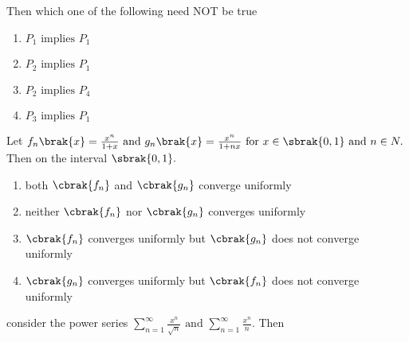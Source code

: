 Then which one of the following need NOT be true
\begin{multicols}{4}
    \begin{enumerate}
        \item $P_{1} \text{ implies } P_{1}$
        \item $P_{2} \text{ implies } P_{1}$
        \item $P_{2} \text{ implies } P_{4}$
        \item $P_{3} \text{ implies } P_{1}$
    \end{enumerate}
\end{multicols}
\bigskip
\item Let $f_n\brak{x}=\frac{x^{n}}{1+x} \text{ and } g_{n}\brak{x}=\frac{x^{n}}{1+nx} \text{ for } x\in \sbrak{0,1} \text{ and } n\in N.$ Then on the interval $\sbrak{0,1}.$

    \begin{enumerate}
        \item both $\cbrak{f_{n}}$ and $\cbrak{g_{n}}$ converge uniformly
        \item  neither  $\cbrak{f_{n}}$  nor $\cbrak{g_{n}}$ converges uniformly
        \item $\cbrak{f_{n}}$ converges uniformly but $\cbrak{g_{n}}$ does not converge uniformly
        \item $\cbrak{g_{n}}$ converges uniformly but $\cbrak{f_{n}}$ does not converge uniformly
    \end{enumerate}
\bigskip
\item consider the power series $\sum_{n=1}^{\infty}\frac{x^{n}}{\sqrt{n}} \text{ and } \sum_{n=1}^{\infty}\frac{x^{n}}{n} .$ Then 

